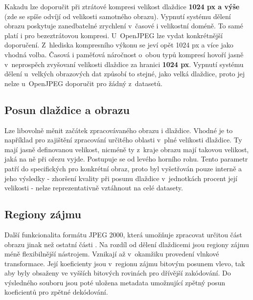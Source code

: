 Kakadu lze doporučit při ztrátové kompresi velikost dlaždice \textbf{1024 px a výše} (zde se spíše odvíjí od velikosti samotného obrazu). Vypnutí systému dělení obrazu poskytuje zanedbatelné zrychlení v~časové i velikostní doméně. To samé platí i pro bezeztrátovou kompresi. U~OpenJPEG lze vydat konkrétnější doporučení. Z~hlediska kompresního výkonu se jeví opět 1024 px a více jako vhodná volba. Časová i paměťová náročnost o~obou typů kompresí hovoří jasně v~neprospěch zvyšovaní velikosti dlaždice za hranici \textbf{1024 px}. Vypnutí systému dělení u~velkých obrazových dat způsobí to stejné, jako velká dlaždice, proto jej nelze u~OpenJPEG doporučit pro žádný z~datasetů.


\clearpage
\newpage
\subsection*{Posun dlaždice a obrazu}
Lze libovolně měnit začátek zpracovávaného obrazu i dlaždice. Vhodné je to například pro zajištění zpracování určitého oblasti v~plné velikosti dlaždice. Ty mají jasně definovanou velikost, nicméně ty z~kraje obrazu mají takovou velikost, jaká na ně při ořezu vyjde. Postupuje se od levého horního rohu. Tento parametr patří do specifických pro konkrétní obraz, proto byl vyšetřován pouze interně a jeho výsledky - zhoršení kvality při posunu dlaždice v~jednotkách procent její velikosti - nelze reprezentativně vztáhnout na celé datasety.

%
%
\subsection*{Regiony zájmu}
Další funkcionalita formátu JPEG 2000, která umožňuje zpracovat určitou část obrazu jinak než ostatní části \cite{roi}. Na rozdíl od dělení dlaždicemi jsou regiony zájmu méně flexibilnější nástrojem. Vznikají až v~okamžiku provedení vlnkové transformace. Její koeficienty jsou v~regionu zájmu  bitovým posunem vlevo, tak aby byly obsaženy ve vyšších bitových rovinách pro dřívější zakódování. Do výsledného souboru jsou poté uložena metadata umožnující zpětný posun koeficientů pro zpětné dekódování. 

